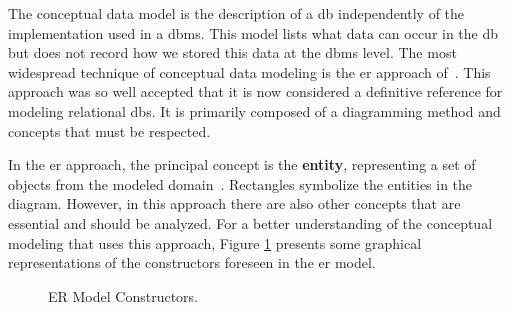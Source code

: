 The conceptual data model is the description of a \ac{db} independently of the implementation used in a \ac{dbms}.
This model lists what data can occur in the \ac{db} but does not record how we stored this data at the \ac{dbms} level.
The most widespread technique of conceptual data modeling is the \ac{er} approach of~\cite{Chen:1976}.
This approach was so well accepted that it is now considered a definitive reference for modeling relational \acp{db}.
It is primarily composed of a diagramming method and concepts that must be respected.

In the \ac{er} approach, the principal concept is the \textbf{entity}, representing a set of objects from the modeled domain~\cite{Heuser:2009}. 
Rectangles symbolize the entities in the diagram. 
However, in this approach there are also other concepts that are essential and should be analyzed. 
For a better understanding of the conceptual modeling that uses this approach, Figure \ref{fig:ERConstructors} presents some graphical representations of the constructors foreseen in the \ac{er} model.

\begin{figure} [!htb]
    \centering
    \caption{ER Model Constructors.}
    \label{fig:ERConstructors}
    
\end{figure}

